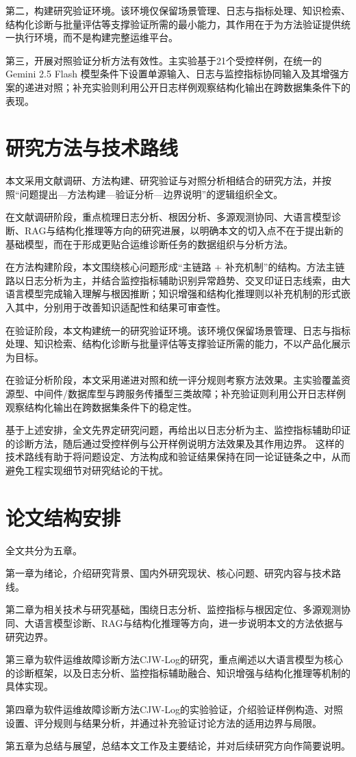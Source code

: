 第二，构建研究验证环境。该环境仅保留场景管理、日志与指标处理、知识检索、结构化诊断与批量评估等支撑验证所需的最小能力，其作用在于为方法验证提供统一执行环境，而不是构建完整运维平台。

第三，开展对照验证分析方法有效性。主实验基于21个受控样例，在统一的 Gemini 2.5 Flash 模型条件下设置单源输入、日志与监控指标协同输入及其增强方案的递进对照；补充实验则利用公开日志样例观察结构化输出在跨数据集条件下的表现。

\section{研究方法与技术路线}

本文采用文献调研、方法构建、研究验证与对照分析相结合的研究方法，并按照“问题提出—方法构建—验证分析—边界说明”的逻辑组织全文。

在文献调研阶段，重点梳理日志分析、根因分析、多源观测协同、大语言模型诊断、RAG与结构化推理等方向的研究进展，以明确本文的切入点不在于提出新的基础模型，而在于形成更贴合运维诊断任务的数据组织与分析方法。

在方法构建阶段，本文围绕核心问题形成“主链路 + 补充机制”的结构。方法主链路以日志分析为主，并结合监控指标辅助识别异常趋势、交叉印证日志线索，由大语言模型完成输入理解与根因推断；知识增强和结构化推理则以补充机制的形式嵌入其中，分别用于改善知识适配性和结果可审查性。

在验证阶段，本文构建统一的研究验证环境。该环境仅保留场景管理、日志与指标处理、知识检索、结构化诊断与批量评估等支撑验证所需的能力，不以产品化展示为目标。

在验证分析阶段，本文采用递进对照和统一评分规则考察方法效果。主实验覆盖资源型、中间件/数据库型与跨服务传播型三类故障；补充验证则利用公开日志样例观察结构化输出在跨数据集条件下的稳定性。

基于上述安排，全文先界定研究问题，再给出以日志分析为主、监控指标辅助印证的诊断方法，随后通过受控样例与公开样例说明方法效果及其作用边界。
这样的技术路线有助于将问题设定、方法构成和验证结果保持在同一论证链条之中，从而避免工程实现细节对研究结论的干扰。

\section{论文结构安排}

全文共分为五章。

第一章为绪论，介绍研究背景、国内外研究现状、核心问题、研究内容与技术路线。

第二章为相关技术与研究基础，围绕日志分析、监控指标与根因定位、多源观测协同、大语言模型诊断、RAG与结构化推理等方向，进一步说明本文的方法依据与研究边界。

第三章为软件运维故障诊断方法CJW-Log的研究，重点阐述以大语言模型为核心的诊断框架，以及日志分析、监控指标辅助融合、知识增强与结构化推理等机制的具体实现。

第四章为软件运维故障诊断方法CJW-Log的实验验证，介绍验证样例构造、对照设置、评分规则与结果分析，并通过补充验证讨论方法的适用边界与局限。

第五章为总结与展望，总结本文工作及主要结论，并对后续研究方向作简要说明。
